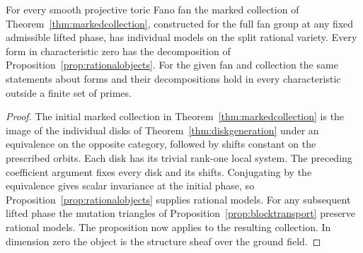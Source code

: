 \begin{corollary}\label{cor:fanfield}
For every smooth projective toric Fano fan the marked collection of Theorem~\ref{thm:markedcollection}, constructed for the full fan group at any fixed admissible lifted phase, has individual models on the split rational variety. Every form in characteristic zero has the decomposition of Proposition~\ref{prop:rationalobjects}. For the given fan and collection the same statements about forms and their decompositions hold in every characteristic outside a finite set of primes.
\end{corollary}

\begin{proof}
The initial marked collection in Theorem~\ref{thm:markedcollection} is the image of the individual disks of Theorem~\ref{thm:diskgeneration} under an equivalence on the opposite category, followed by shifts constant on the prescribed orbits. Each disk has its trivial rank-one local system. The preceding coefficient argument fixes every disk and its shifts. Conjugating by the equivalence gives scalar invariance at the initial phase, so Proposition~\ref{prop:rationalobjects} supplies rational models. For any subsequent lifted phase the mutation triangles of Proposition~\ref{prop:blocktransport} preserve rational models. The proposition now applies to the resulting collection. In dimension zero the object is the structure sheaf over the ground field.
\end{proof}
